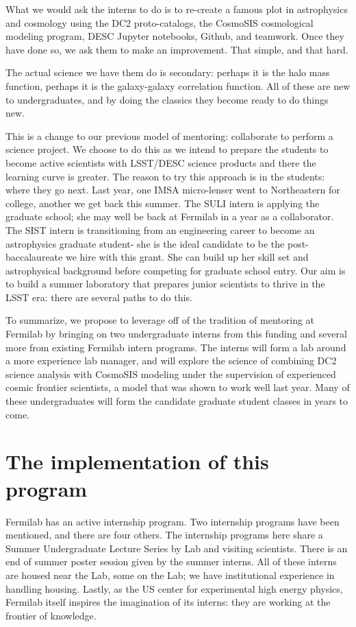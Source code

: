 What we would ask the interns to do
is to re-create a famous plot in astrophysics and cosmology using
the DC2 proto-catalogs, the CosmoSIS cosmological modeling program,
DESC Jupyter notebooks, Github, and teamwork. Once they have done so,
we ask them to make an improvement. That simple, and that hard.

The actual science we have them do is secondary: perhaps it is the
halo mass function, perhaps it is the galaxy-galaxy correlation function.
All of these are new to undergraduates, and by doing the classics they
become ready to do things new.

This is a change to our previous model of mentoring:
collaborate to perform a science project. We choose to do this
as we intend to prepare the students to become active scientists
with LSST/DESC science products and there the learning curve is greater.
The reason to try this approach is in the students: where they go next.
Last year, one IMSA micro-lenser went to
Northeastern for college, another we get back this summer. The SULI
intern is applying the graduate school; she may well be back at Fermilab
in a year as a collaborator. The SIST intern is transitioning from 
an engineering career to become an astrophysics graduate student- 
she is the ideal candidate
to be the post-baccalaureate we hire with this grant. She can build
up her skill set and astrophysical background before competing for
graduate school entry. Our aim is to build a summer laboratory 
that prepares junior scientists to thrive in the LSST era: there
are several paths to do this. 

To summarize, we  propose to leverage off of the tradition 
of mentoring at Fermilab by
bringing on two undergraduate interns from this funding
and several more from existing Fermilab intern programs.
The interns will form a lab around a more experience
lab manager, and will explore the science
of combining DC2 science analysis with CosmoSIS modeling
under the supervision of experienced cosmic
frontier scientists, a model that was shown to work
well last year. Many of these  undergraduates will
form the candidate graduate student classes in years to come.

\newpage
\section{The implementation of this program}

Fermilab has an active internship program. Two internship programs
have been mentioned, and there are four others. The internship
programs here share a Summer Undergraduate Lecture Series by
Lab and visiting scientists. There is an end of summer poster
session given by the summer interns. All of these interns
are housed near the Lab, some on the Lab; we have institutional
experience in handling housing. Lastly, as the US center for
experimental high energy physics, Fermilab itself inspires
the imagination of its interns: they are working at the frontier
of knowledge.

